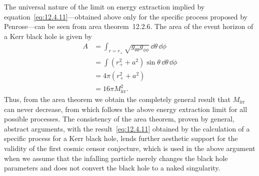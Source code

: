 The universal nature of the limit on energy extraction implied by
equation~\eqref{eq:12.4.11}---obtained above only for the specific process proposed
by Penrose---can be seen from area theorem~12.2.6. The area of the event horizon
of a Kerr black hole is given by
\begin{equation}
\begin{aligned}
 A&=\int_{r=r_+}\sqrt{g_{\theta\theta}g_{\phi\phi}}\,\dd\theta\,\dd\phi\\
  &=\int(r_+^2+a^2)\sin\theta\,\dd\theta\,\dd\phi\\
  &=4\pi(r_+^2+a^2)\\
  &=16\pi M_{\mathrm{irr}}^2 .
\end{aligned}
\tag{12.4.12}\label{eq:12.4.12}
\end{equation}
Thus, from the area theorem we obtain the completely general result that
\(M_{\mathrm{irr}}\) can never decrease, from which follows the above energy
extraction limit for all possible processes. The consistency of the area theorem,
proven by general, abstract arguments, with the result~\eqref{eq:12.4.11} obtained
by the calculation of a specific process for a Kerr black hole, lends further aesthetic
support for the validity of the first cosmic censor conjecture, which is used in the
above argument when we assume that the infalling particle merely changes the black
hole parameters and does not convert the black hole to a naked singularity.

